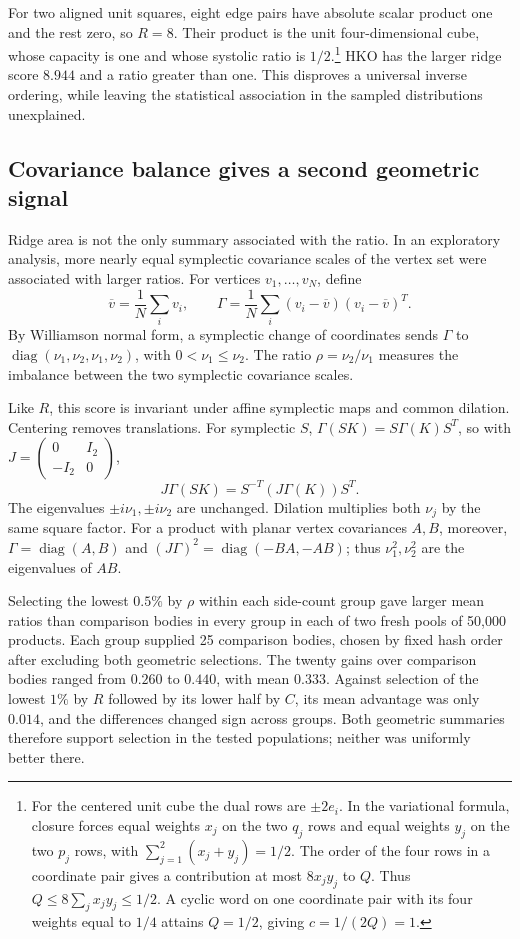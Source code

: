 For two aligned unit
squares, eight edge pairs have absolute scalar product one and the rest
zero, so $R=8$. Their product is the unit four-dimensional cube, whose
capacity is one and whose systolic ratio is $1/2$.\footnote{For the centered
unit cube the dual rows are $\pm2e_i$. In the variational formula, closure
forces equal weights $x_j$ on the two $q_j$ rows and equal weights $y_j$ on
the two $p_j$ rows, with $\sum_{j=1}^2(x_j+y_j)=1/2$. The order of the four
rows in a coordinate pair gives a contribution at most $8x_jy_j$ to $Q$.
Thus $Q\leq8\sum_jx_jy_j\leq1/2$. A cyclic word on one coordinate pair
with its four weights equal to $1/4$ attains $Q=1/2$, giving $c=1/(2Q)=1$.} HKO has the larger ridge
score $8.944$ and a ratio greater than one. This disproves a universal inverse ordering, while leaving the
statistical association in the sampled distributions unexplained.


\subsection{Covariance balance gives a second geometric signal}

Ridge area is not the only summary associated with the ratio. In an
exploratory analysis, more nearly equal symplectic covariance scales of
the vertex set were associated with larger ratios. For vertices
$v_1,\ldots,v_N$, define
\[
 \overline v=\frac1N\sum_i v_i,\qquad
 \Gamma=\frac1N\sum_i(v_i-\overline v)(v_i-\overline v)^T.
\]
By Williamson normal form, a symplectic change of coordinates sends
$\Gamma$ to $\operatorname{diag}(\nu_1,\nu_2,\nu_1,\nu_2)$, with
$0<\nu_1\leq\nu_2$.
The ratio $\rho=\nu_2/\nu_1$ measures the imbalance between the two
symplectic covariance scales.

Like $R$, this score is invariant under affine symplectic maps and common
dilation. Centering removes translations. For symplectic $S$,
$\Gamma(SK)=S\Gamma(K)S^T$, so with
$J=\left(\begin{smallmatrix}0&I_2\\-I_2&0\end{smallmatrix}\right)$,
\[
 J\Gamma(SK)=S^{-T}(J\Gamma(K))S^T.
\]
The eigenvalues $\pm i\nu_1,\pm i\nu_2$ are unchanged. Dilation multiplies
both $\nu_j$ by the same square factor. For a product with planar vertex
covariances $A,B$, moreover, $\Gamma=\operatorname{diag}(A,B)$ and
$(J\Gamma)^2=\operatorname{diag}(-BA,-AB)$; thus $\nu_1^2,\nu_2^2$ are
the eigenvalues of $AB$.

Selecting the lowest $0.5\%$ by $\rho$ within each side-count group
gave larger mean ratios than comparison bodies in every group in each
of two fresh pools of 50,000 products. Each group supplied 25 comparison bodies, chosen by
fixed hash order after excluding both geometric selections. The twenty
gains over comparison bodies ranged from $0.260$ to $0.440$, with mean
$0.333$. Against selection of the lowest $1\%$ by $R$ followed by its
lower half by $C$, its mean advantage was only $0.014$, and the differences
changed sign across groups. Both geometric summaries therefore support
selection in the tested populations; neither was uniformly better there.

